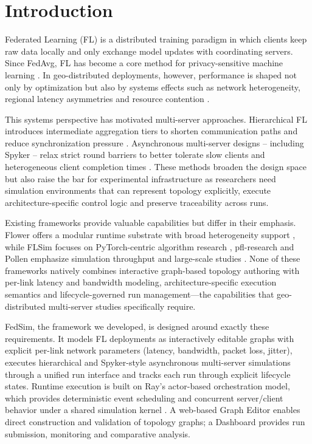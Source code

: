 \documentclass[conference]{IEEEtran}
\begin{document}
\section{Introduction}
Federated Learning (FL) is a distributed training paradigm in which clients keep raw data locally and only exchange model updates with coordinating servers. Since FedAvg, FL has become a core method for privacy-sensitive machine learning \cite{mcmahan2017}. In geo-distributed deployments, however, performance is shaped not only by optimization but also by systems effects such as network heterogeneity, regional latency asymmetries and resource contention \cite{kairouz2021}.

This systems perspective has motivated multi-server approaches. Hierarchical FL introduces intermediate aggregation tiers to shorten communication paths and reduce synchronization pressure \cite{abad2020}. Asynchronous multi-server designs -- including Spyker -- relax strict round barriers to better tolerate slow clients and heterogeneous client completion times \cite{zuo2024}. These methods broaden the design space but also raise the bar for experimental infrastructure as researchers need simulation environments that can represent topology explicitly, execute architecture-specific control logic and preserve traceability across runs.

Existing frameworks provide valuable capabilities but differ in their emphasis. Flower offers a modular runtime substrate with broad heterogeneity support \cite{flower}, while FLSim focuses on PyTorch-centric algorithm research \cite{flsim}, pfl-research and Pollen emphasize simulation throughput and large-scale studies \cite{granqvist2024,sani2023}. None of these frameworks natively combines interactive graph-based topology authoring with per-link latency and bandwidth modeling, architecture-specific execution semantics and lifecycle-governed run management—the capabilities that geo-distributed multi-server studies specifically require.

FedSim, the framework we developed, is designed around exactly these requirements. It models FL deployments as interactively editable graphs with explicit per-link network parameters (latency, bandwidth, packet loss, jitter), executes hierarchical and Spyker-style asynchronous multi-server simulations through a unified run interface and tracks each run through explicit lifecycle states. Runtime execution is built on Ray's actor-based orchestration model, which provides deterministic event scheduling and concurrent server/client behavior under a shared simulation kernel \cite{moritz2018ray}. A web-based Graph Editor enables direct construction and validation of topology graphs; a Dashboard provides run submission, monitoring and comparative analysis.
\end{document}
